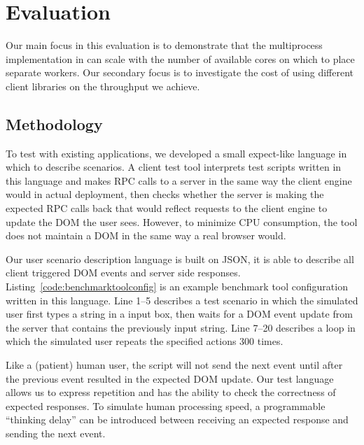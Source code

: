 \chapter{Evaluation}

Our main focus in this evaluation is to demonstrate that the multiprocess implementation
in \cbtwo can scale with the number of available cores on which to place separate workers.
Our secondary focus is to investigate the cost of using different client libraries on 
the throughput we achieve.

\section{Methodology}
To test \cbtwo with existing applications, we developed a small expect-like language 
in which to describe scenarios. A client test tool interprets test scripts written in
this language and makes RPC calls to a server in the same way the client engine would
in actual deployment, then checks whether the server is making the expected RPC
calls back that would reflect requests to the client engine to update the DOM the
user sees.  
However, to minimize CPU consumption, the tool does not maintain a DOM in the same
way a real browser would.



Our user scenario description language is built on JSON, it is
able to describe all client triggered DOM events and server side responses. 
Listing~\ref{code:benchmarktoolconfig} is an example benchmark tool configuration
written in this language.
Line 1--5
 describes a test scenario in which the simulated user first types a string
in a input box, then waits for a DOM event update from the server that contains
the previously input string.
Line 7--20 describes a loop in which the simulated user repeats the specified actions 
300 times.
 

Like a (patient) human user, the script will not send the next event until after the
previous event resulted in the expected DOM update.
Our test language allows us to express repetition and has the ability to check
the correctness of expected responses.
To simulate human processing speed, a programmable ``thinking delay'' can be introduced 
between receiving an expected response and sending the next event.

